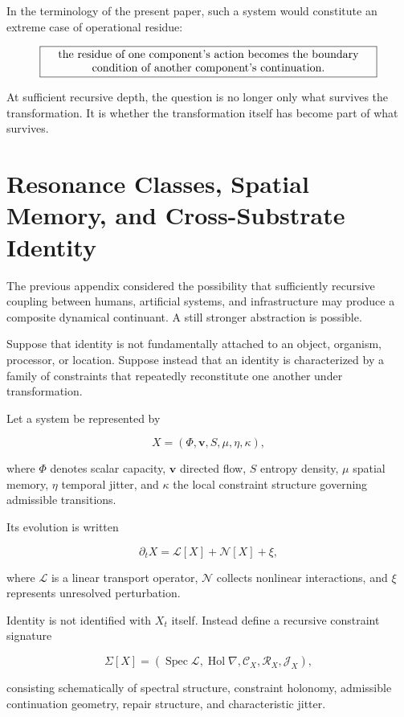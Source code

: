 \documentclass[11pt]{article}
\begin{document}
In the terminology of the present paper, such a system would constitute an extreme case of operational residue:

\[
\boxed{
\parbox{0.85\textwidth}{\centering
the residue of one component's action becomes
the boundary condition of another component's continuation.}
}
\]

At sufficient recursive depth, the question is no longer only what survives the transformation. It is whether the transformation itself has become part of what survives.

\section{Resonance Classes, Spatial Memory, and Cross-Substrate Identity}

The previous appendix considered the possibility that sufficiently recursive coupling between humans, artificial systems, and infrastructure may produce a composite dynamical continuant. A still stronger abstraction is possible.

Suppose that identity is not fundamentally attached to an object, organism, processor, or location. Suppose instead that an identity is characterized by a family of constraints that repeatedly reconstitute one another under transformation.

Let a system be represented by

\[
X=(\Phi,\mathbf{v},S,\mu,\eta,\kappa),
\]

where $\Phi$ denotes scalar capacity, $\mathbf{v}$ directed flow, $S$ entropy density, $\mu$ spatial memory, $\eta$ temporal jitter, and $\kappa$ the local constraint structure governing admissible transitions.

Its evolution is written

\[
\partial_t X
=
\mathcal{L}[X]
+
\mathcal{N}[X]
+
\xi,
\]

where $\mathcal{L}$ is a linear transport operator, $\mathcal{N}$ collects nonlinear interactions, and $\xi$ represents unresolved perturbation.

Identity is not identified with $X_t$ itself. Instead define a recursive constraint signature

\[
\Sigma[X]
=
\left(
\operatorname{Spec}\mathcal{L},
\operatorname{Hol}\nabla,
\mathcal{C}_X,
\mathcal{R}_X,
\mathcal{J}_X
\right),
\]

consisting schematically of spectral structure, constraint holonomy, admissible continuation geometry, repair structure, and characteristic jitter.
\end{document}

